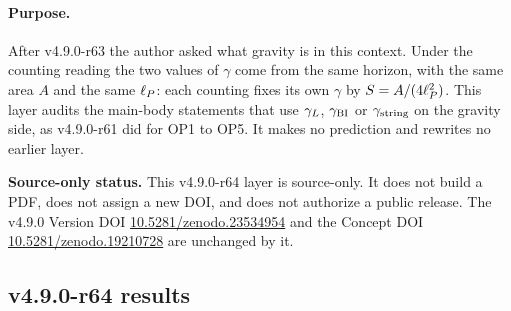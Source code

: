 \paragraph{Purpose.}
After v4.9.0-r63 the author asked what gravity is in this context.  Under the counting reading the two values of \(\gamma\) come from the same horizon, with the same area
\(A\) and the same \(\ell_P\): each counting fixes its own \(\gamma\) by \(S=A/(4\ell_P^2)\).  This layer audits the main-body statements that use \(\gamma_L\), \(\gamma_{\mathrm{BI}}\) or \(\gamma_{\mathrm{string}}\) on the
gravity side, as v4.9.0-r61 did for OP1 to OP5.  It makes no prediction and rewrites no earlier layer.

\noindent\textbf{Source-only status.}
This v4.9.0-r64 layer is source-only.  It does not build a PDF, does not assign a new DOI,
and does not authorize a public release.  The v4.9.0 Version DOI
\href{https://doi.org/10.5281/zenodo.23534954}{10.5281/zenodo.23534954} and the Concept DOI
\href{https://doi.org/10.5281/zenodo.19210728}{10.5281/zenodo.19210728} are unchanged by it.

\subsection*{v4.9.0-r64 results}
\label{subsec:v490-r64-results}

